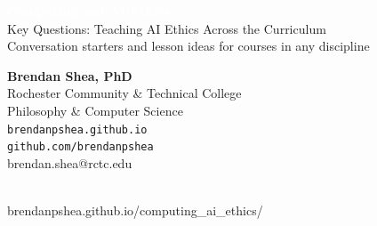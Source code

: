 \documentclass[10pt,letterpaper]{article}
\begin{document}

\begin{tcolorbox}[
  enhanced,
  colback=mPrimary,
  colframe=mPrimary,
  boxrule=0pt,
  arc=3pt,
  left=10pt, right=10pt,
  top=9pt, bottom=9pt,
  before skip=0pt,
  after skip=6pt,
]
\begin{minipage}[c]{0.54\linewidth}
  {\sffamily\bfseries\Large\textcolor{white}{Computing and AI Ethics}}\\[4pt]
  {\sffamily\large\textcolor{mAccent}{%
    Key Questions: Teaching AI Ethics Across the Curriculum}}\\[3pt]
  {\sffamily\small\textcolor{white!70!mPrimary}{%
    Conversation starters and lesson ideas for courses in any discipline}}
\end{minipage}%
\hfill
\begin{minipage}[c]{0.26\linewidth}
  \raggedright
  {\sffamily\footnotesize\textcolor{white!80!mPrimary}{%
    \textbf{Brendan Shea, PhD}\\
    Rochester Community \& Technical College\\
    Philosophy \& Computer Science\\[4pt]
    \faGlobe\enspace\texttt{brendanpshea.github.io}\\
    \faGithub\enspace\texttt{github.com/brendanpshea}\\
    \faEnvelope\enspace brendan.shea@rctc.edu%
  }}
\end{minipage}%
\hfill
\begin{minipage}[c]{0.155\linewidth}
  \centering
  \\[3pt]
  {\sffamily\fontsize{5.0}{6.2}\selectfont\textcolor{white!80!mPrimary}%
    {brendanpshea.github.io/\linebreak computing\_ai\_ethics/}}
\end{minipage}
\end{tcolorbox}
\end{document}
